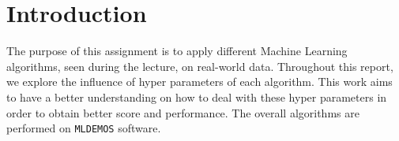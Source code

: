 \section{Introduction}


The purpose of this assignment is to apply different Machine Learning algorithms, seen during the lecture, on real-world data. Throughout this report, we explore the influence of hyper parameters of each algorithm. This work aims to have a better understanding on how to deal with these hyper parameters in order to obtain better score and performance. The overall algorithms are performed on \texttt{MLDEMOS} software.